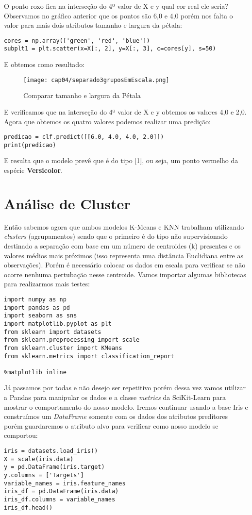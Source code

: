 O ponto roxo fica na interseção do 4º valor de X e y qual cor real ele seria? Observamos no gráfico anterior que os pontos são 6,0 e 4,0 porém nos falta o valor para mais dois atributos tamanho e largura da pétala:
\begin{lstlisting}[]
cores = np.array(['green', 'red', 'blue'])
subplt1 = plt.scatter(x=X[:, 2], y=X[:, 3], c=cores[y], s=50)
\end{lstlisting}

E obtemos como resultado:
\begin{figure}[H]
	\centering
	\texttt{[image: cap04/separado3gruposEmEscala.png]}
	\caption{Comparar tamanho e largura da Pétala}
\end{figure}

E verificamos que na interseção do 4º valor de X e y obtemos os valores 4,0 e 2,0. Agora que obtemos os quatro valores podemos realizar uma predição:
\begin{lstlisting}[]
predicao = clf.predict([[6.0, 4.0, 4.0, 2.0]])
print(predicao)
\end{lstlisting}

E resulta que o modelo prevê que é do tipo [1], ou seja, um ponto vermelho da espécie \textbf{Versicolor}. 

\section{Análise de Cluster}
Então sabemos agora que ambos modelos K-Means e KNN trabalham utilizando \textit{clusters} (agrupamentos) sendo que o primeiro é do tipo não supervisionado destinado a separação com base em um número de centroides (k) presentes e os valores médios mais próximos (isso representa uma distância Euclidiana entre as observações). Porém é necessário colocar os dados em escala para verificar se não ocorre nenhuma pertubação nesse centroide. Vamos importar algumas bibliotecas para realizarmos mais testes:
\begin{lstlisting}[]
import numpy as np
import pandas as pd
import seaborn as sns
import matplotlib.pyplot as plt
from sklearn import datasets
from sklearn.preprocessing import scale
from sklearn.cluster import KMeans
from sklearn.metrics import classification_report

%matplotlib inline
\end{lstlisting}

Já passamos por todas e não desejo ser repetitivo porém dessa vez vamos utilizar a Pandas para manipular os dados e a classe \textit{metrics} da SciKit-Learn para mostrar o comportamento do nosso modelo. Iremos continuar usando a base Iris e construímos um \textit{DataFrame} somente com os dados dos atributos preditores porém guardaremos o atributo alvo para verificar como nosso modelo se comportou:
\begin{lstlisting}[]
iris = datasets.load_iris()
X = scale(iris.data)
y = pd.DataFrame(iris.target)
y.columns = ['Targets']
variable_names = iris.feature_names
iris_df = pd.DataFrame(iris.data)
iris_df.columns = variable_names
iris_df.head()
\end{lstlisting}

